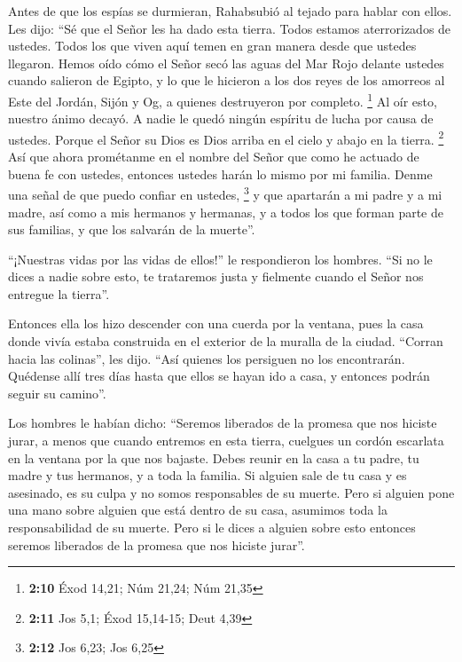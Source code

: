  Antes de que los espías se durmieran, Rahabsubió al
tejado para hablar con ellos.  Les dijo: ``Sé que el Señor
les ha dado esta tierra. Todos estamos aterrorizados de ustedes. Todos
los que viven aquí temen en gran manera desde que ustedes llegaron.
 Hemos oído cómo el Señor secó las aguas del Mar Rojo
delante ustedes cuando salieron de Egipto, y lo que le hicieron a los
dos reyes de los amorreos al Este del Jordán, Sijón y Og, a quienes
destruyeron por completo. \footnote{\textbf{2:10} Éxod 14,21; Núm 21,24;
  Núm 21,35}  Al oír esto, nuestro ánimo decayó. A nadie
le quedó ningún espíritu de lucha por causa de ustedes. Porque el Señor
su Dios es Dios arriba en el cielo y abajo en la tierra. \footnote{\textbf{2:11}
  Jos 5,1; Éxod 15,14-15; Deut 4,39}  Así que ahora
prométanme en el nombre del Señor que como he actuado de buena fe con
ustedes, entonces ustedes harán lo mismo por mi familia. Denme una señal
de que puedo confiar en ustedes, \footnote{\textbf{2:12} Jos 6,23; Jos
  6,25}  y que apartarán a mi padre y a mi madre, así
como a mis hermanos y hermanas, y a todos los que forman parte de sus
familias, y que los salvarán de la muerte''.

 ``¡Nuestras vidas por las vidas de ellos!'' le
respondieron los hombres. ``Si no le dices a nadie sobre esto, te
trataremos justa y fielmente cuando el Señor nos entregue la tierra''.

 Entonces ella los hizo descender con una cuerda por la
ventana, pues la casa donde vivía estaba construida en el exterior de la
muralla de la ciudad.  ``Corran hacia las colinas'', les
dijo. ``Así quienes los persiguen no los encontrarán. Quédense allí tres
días hasta que ellos se hayan ido a casa, y entonces podrán seguir su
camino''.

 Los hombres le habían dicho: ``Seremos liberados de la
promesa que nos hiciste jurar,  a menos que cuando
entremos en esta tierra, cuelgues un cordón escarlata en la ventana por
la que nos bajaste. Debes reunir en la casa a tu padre, tu madre y tus
hermanos, y a toda la familia.  Si alguien sale de tu
casa y es asesinado, es su culpa y no somos responsables de su muerte.
Pero si alguien pone una mano sobre alguien que está dentro de su casa,
asumimos toda la responsabilidad de su muerte.  Pero si
le dices a alguien sobre esto entonces seremos liberados de la promesa
que nos hiciste jurar''.

